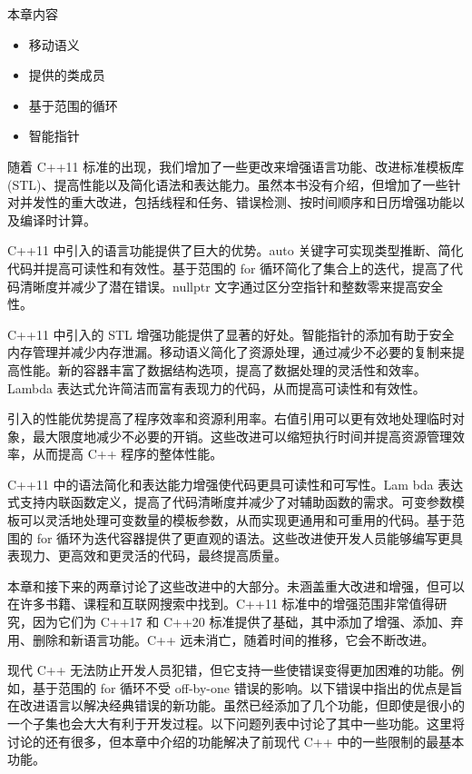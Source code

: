 本章内容

\begin{itemize}
\item
移动语义

\item
提供的类成员

\item
基于范围的循环

\item
智能指针
\end{itemize}

随着 C++11 标准的出现，我们增加了一些更改来增强语言功能、改进标准模板库 (STL)、提高性能以及简化语法和表达能力。虽然本书没有介绍，但增加了一些针对并发性的重大改进，包括线程和任务、错误检测、按时间顺序和日历增强功能以及编译时计算。

C++11 中引入的语言功能提供了巨大的优势。auto 关键字可实现类型推断、简化代码并提高可读性和有效性。基于范围的 for 循环简化了集合上的迭代，提高了代码清晰度并减少了潜在错误。nullptr 文字通过区分空指针和整数零来提高安全性。

C++11 中引入的 STL 增强功能提供了显著的好处。智能指针的添加有助于安全内存管理并减少内存泄漏。移动语义简化了资源处理，通过减少不必要的复制来提高性能。新的容器丰富了数据结构选项，提高了数据处理的灵活性和效率。Lambda 表达式允许简洁而富有表现力的代码，从而提高可读性和有效性。

引入的性能优势提高了程序效率和资源利用率。右值引用可以更有效地处理临时对象，最大限度地减少不必要的开销。这些改进可以缩短执行时间并提高资源管理效率，从而提高 C++ 程序的整体性能。

C++11 中的语法简化和表达能力增强使代码更具可读性和可写性。Lam bda 表达式支持内联函数定义，提高了代码清晰度并减少了对辅助函数的需求。可变参数模板可以灵活地处理可变数量的模板参数，从而实现更通用和可重用的代码。基于范围的 for 循环为迭代容器提供了更直观的语法。这些改进使开发人员能够编写更具表现力、更高效和更灵活的代码，最终提高质量。

本章和接下来的两章讨论了这些改进中的大部分。未涵盖重大改进和增强，但可以在许多书籍、课程和互联网搜索中找到。C++11 标准中的增强范围非常值得研究，因为它们为 C++17 和 C++20 标准提供了基础，其中添加了增强、添加、弃用、删除和新语言功能。C++ 远未消亡，随着时间的推移，它会不断改进。

现代 C++ 无法防止开发人员犯错，但它支持一些使错误变得更加困难的功能。例如，基于范围的 for 循环不受 off-by-one 错误的影响。以下错误中指出的优点是旨在改进语言以解决经典错误的新功能。虽然已经添加了几个功能，但即使是很小的一个子集也会大大有利于开发过程。以下问题列表中讨论了其中一些功能。这里将讨论的还有很多，但本章中介绍的功能解决了前现代 C++ 中的一些限制的最基本功能。








